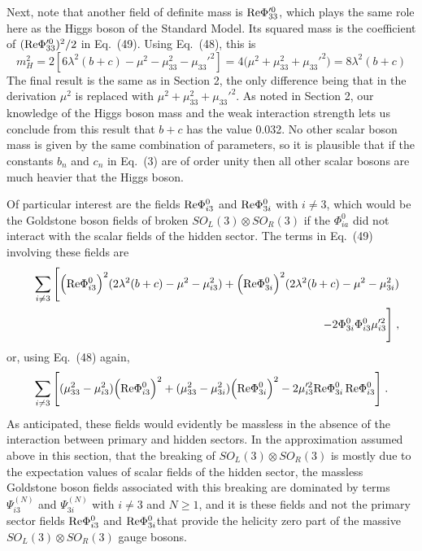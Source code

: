 Next, note that another  field of definite mass is ${\rm Re}\Phi_{33}'^0$, which plays the same role here as the Higgs boson of the Standard Model.
Its squared mass is the coefficient of $({\rm Re}\Phi_{33}'^0)^2/2$  in Eq.~(49).  Using Eq.~(48), this is
\begin{equation}
m_H^2=2[6\lambda^2(b+c)-\mu^2-\mu_{33}^2-\mu_{33}'^2]=4\Big(\mu^2+\mu_{33}^2+\mu_{33}'^2\Big)=8\lambda^2(b+c)
\end{equation}
The final result is the same as in Section 2, the only difference being that in the derivation $\mu^2$ is replaced with 
$\mu^2+\mu_{33}^2+\mu_{33}'^2$.  As noted in Section 2, our knowledge of the Higgs boson mass and the weak interaction strength lets us conclude from this result that $b+c$ has the value 0.032.  No other scalar boson mass is given by the same combination of parameters, so it is plausible that if the constants $b_n$ and $c_n$ in Eq.~(3) are of order unity then  all other scalar bosons are much heavier that the Higgs boson.

Of particular interest are the fields ${\rm Re}\Phi_{i3}^0$ and ${\rm Re}\Phi_{3i}^0$ with $i\neq 3$, which would be the Goldstone boson fields of broken 
$SO_L(3)\otimes SO_R(3)$ if the $\Phi^0_{ia}$ did not interact with the scalar fields of the hidden sector.  The terms in Eq.~(49) involving these fields are
\begin{eqnarray*}
&&\sum_{i\neq 3}\Bigg[\Big({\rm Re}\Phi^0_{i3}\Big)^2(2\lambda^2(b+c)-\mu^2-\mu_{i3}^2)
+\Big({\rm Re}\Phi^0_{3i}\Big)^2(2\lambda^2(b+c)-\mu^2-\mu_{3i}^2)\\&&
-2\Phi^0_{3i}\Phi^0_{i3}\mu'^2_{i3}\Bigg]\;,
\end{eqnarray*}
or, using Eq.~(48) again,
\begin{equation}
\sum_{i\neq 3}\Bigg[(\mu^2_{33}-\mu_{i3}^2)\Big({\rm Re}\Phi^0_{i3}\Big)^2
+(\mu^2_{33}-\mu_{3i}^2)\Big({\rm Re}\Phi^0_{3i}\Big)^2
-2\mu'^2_{i3}{\rm Re}\Phi^0_{3i}\,{\rm Re}\Phi^0_{i3}\Bigg]\;.
\end{equation}
As anticipated, these fields would evidently be massless  in the absence of the interaction between primary and hidden sectors.  
In the approximation assumed above in this section, that the breaking of $SO_L(3)\otimes SO_R(3)$ is mostly due to the expectation values of scalar fields of the hidden sector, the massless Goldstone boson fields associated with this breaking are dominated by terms $\Psi^{(N)}_{i3}$ and 
$\Psi^{(N)}_{3i}$ with $i\neq 3$ and $N\geq 1$, and it is these fields and not the primary sector fields ${\rm Re}\Phi^0_{i3}$ and ${\rm Re}\Phi^0_{3i}$that provide the helicity zero part of the massive  
$SO_L(3)\otimes SO_R(3)$ gauge bosons.


